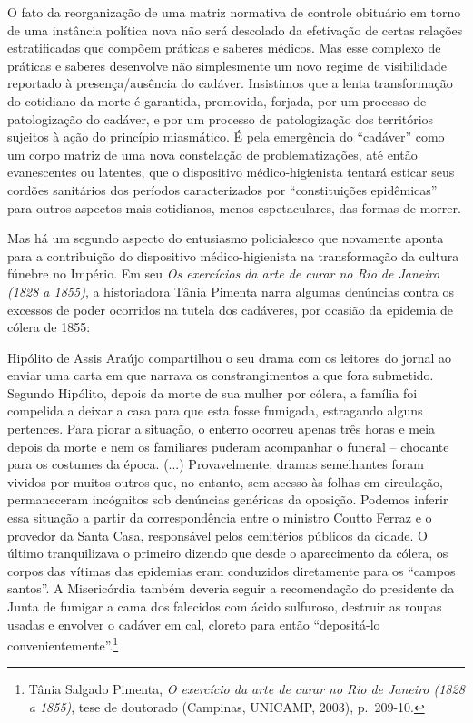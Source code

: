 O fato da reorganização de uma matriz normativa de controle obituário em
torno de uma instância política nova não será descolado da efetivação de
certas relações estratificadas que compõem práticas e saberes médicos.
Mas esse complexo de práticas e saberes desenvolve não simplesmente um
novo regime de visibilidade reportado à presença/ausência do cadáver.
Insistimos que a lenta transformação do cotidiano da morte é garantida,
promovida, forjada, por um processo de patologização do cadáver, e por
um processo de patologização dos territórios sujeitos à ação do
princípio miasmático. É pela emergência do ``cadáver'' como um corpo
matriz de uma nova constelação de problematizações, até então
evanescentes ou latentes, que o dispositivo médico-higienista tentará
esticar seus cordões sanitários dos períodos caracterizados por
``constituições epidêmicas'' para outros aspectos mais cotidianos, menos
espetaculares, das formas de morrer.

Mas há um segundo aspecto do entusiasmo policialesco que novamente
aponta para a contribuição do dispositivo médico-higienista na
transformação da cultura fúnebre no Império. Em seu \emph{Os exercícios
da arte de curar no Rio de Janeiro (1828 a 1855)}, a historiadora Tânia
Pimenta narra algumas denúncias contra os excessos de poder ocorridos na
tutela dos cadáveres, por ocasião da epidemia de cólera de 1855:

Hipólito de Assis Araújo compartilhou o seu drama com os leitores do
jornal ao enviar uma carta em que narrava os constrangimentos a que fora
submetido. Segundo Hipólito, depois da morte de sua mulher por cólera, a
família foi compelida a deixar a casa para que esta fosse fumigada,
estragando alguns pertences. Para piorar a situação, o enterro ocorreu
apenas três horas e meia depois da morte e nem os familiares puderam
acompanhar o funeral -- chocante para os costumes da época. (...)
Provavelmente, dramas semelhantes foram vividos por muitos outros que,
no entanto, sem acesso às folhas em circulação, permaneceram incógnitos
sob denúncias genéricas da oposição. Podemos inferir essa situação a
partir da correspondência entre o ministro Coutto Ferraz e o provedor da
Santa Casa, responsável pelos cemitérios públicos da cidade. O último
tranquilizava o primeiro dizendo que desde o aparecimento da cólera, os
corpos das vítimas das epidemias eram conduzidos diretamente para os
``campos santos''. A Misericórdia também deveria seguir a recomendação
do presidente da Junta de fumigar a cama dos falecidos com ácido
sulfuroso, destruir as roupas usadas e envolver o cadáver em cal,
cloreto para então ``depositá-lo convenientemente''.\footnote{Tânia
  Salgado Pimenta, \emph{O exercício da arte de curar no Rio de Janeiro
  (1828 a 1855)}, tese de doutorado (Campinas, UNICAMP, 2003),
  p.~209-10.}

